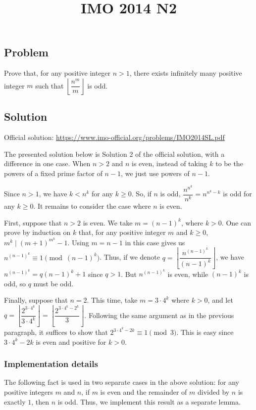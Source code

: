 \documentclass{article}
\title{IMO 2014 N2}
\author{}
\date{}
\begin{document}
\maketitle



\subsection*{Problem}

Prove that, for any positive integer $n > 1$, there exists infinitely many positive integer $m$ such that $\left\lfloor \dfrac{n^m}{m} \right\rfloor$ is odd.



\subsection*{Solution}

Official solution: \url{https://www.imo-official.org/problems/IMO2014SL.pdf}

The presented solution below is Solution 2 of the official solution, with a difference in one case.
When $n > 2$ and $n$ is even, instead of taking $k$ to be the powers of a fixed prime factor of $n - 1$, we just use powers of $n - 1$.

Since $n > 1$, we have $k < n^k$ for any $k \geq 0$.
So, if $n$ is odd, $\dfrac{n^{n^k}}{n^k} = n^{n^k - k}$ is odd for any $k \geq 0$.
It remains to consider the case where $n$ is even.

First, suppose that $n > 2$ is even.
We take $m = (n - 1)^k$, where $k > 0$.
One can prove by induction on $k$ that, for any positive integer $m$ and $k \geq 0$, $m^k \mid (m + 1)^{m^k} - 1$.
Using $m = n - 1$ in this case gives us $n^{(n - 1)^k} \equiv 1 \pmod{(n - 1)^k}$.
Thus, if we denote $q = \left\lfloor \dfrac{n^{(n - 1)^k}}{(n - 1)^k} \right\rfloor$, we have $n^{(n - 1)^k} = q (n - 1)^k + 1$ since $q > 1$.
But $n^{(n - 1)^k}$ is even, while $(n - 1)^k$ is odd, so $q$ must be odd.

Finally, suppose that $n = 2$.
This time, take $m = 3 \cdot 4^k$ where $k > 0$, and let $q = \left\lfloor \dfrac{2^{3 \cdot 4^k}}{3 \cdot 4^k} \right\rfloor = \left\lfloor \dfrac{2^{3 \cdot 4^k - 2^k}}{3} \right\rfloor$.
Following the same argument as in the previous paragraph, it suffices to show that $2^{3 \cdot 4^k - 2k} \equiv 1 \pmod{3}$.
This is easy since $3 \cdot 4^k - 2k$ is even and positive for $k > 0$.



\subsubsection*{Implementation details}

The following fact is used in two separate cases in the above solution:
    for any positive integers $m$ and $n$, if $m$ is even and the remainder of $m$ divided by $n$ is exactly $1$, then $n$ is odd.
Thus, we implement this result as a separate lemma.
\end{document}
